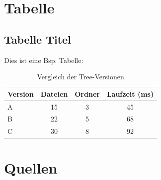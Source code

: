 

\section{Tabelle}                        %
\subsection{Tabelle Titel}               %
Dies ist eine \acs{Bsp.} Tabelle: \par\vspace\baselineskip  %
\begin{table}[H]                         %
    \centering                           %
    \begin{tabular}{|l|c|c|c|}           %
        \hline                           %
        \textbf{Version} & \textbf{Dateien} & \textbf{Ordner} & \textbf{Laufzeit (ms)} \\
        \hline                           %
        A & 15 & 3 & 45 \\               %
        B & 22 & 5 & 68 \\               %
        C & 30 & 8 & 92 \\               %
        \hline                           %
    \end{tabular}
    \caption{Vergleich der Tree-Versionen}  %
    \label{tab:tree-results}             %
\end{table}
\cleardoublepage



\section{Quellen}                        %
